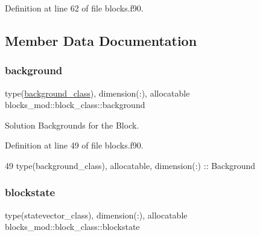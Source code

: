 Definition at line 62 of file blocks.\+f90.



\subsection{Member Data Documentation}
\mbox{\label{structblocks__mod_1_1block__class_a774c07bf82d1392236abc81c285ea943}} 
\subsubsection{\texorpdfstring{background}{background}}
{\footnotesize\ttfamily type(\mbox{\hyperlink{structbackground__mod_1_1background__class}{background\+\_\+class}}), dimension(\+:), allocatable blocks\+\_\+mod\+::block\+\_\+class\+::background\hspace{0.3cm}{\ttfamily [private]}}



Solution Backgrounds for the Block. 



Definition at line 49 of file blocks.\+f90.


\begin{DoxyCode}
49         \textcolor{keywordtype}{type}(background\_class), \textcolor{keywordtype}{allocatable}, \textcolor{keywordtype}{dimension(:)} :: Background
\end{DoxyCode}
\mbox{\label{structblocks__mod_1_1block__class_aadfea105067472c254ff6b9d0ae9e723}} 
\subsubsection{\texorpdfstring{blockstate}{blockstate}}
{\footnotesize\ttfamily type(statevector\+\_\+class), dimension(\+:), allocatable blocks\+\_\+mod\+::block\+\_\+class\+::blockstate\hspace{0.3cm}{\ttfamily [private]}}



